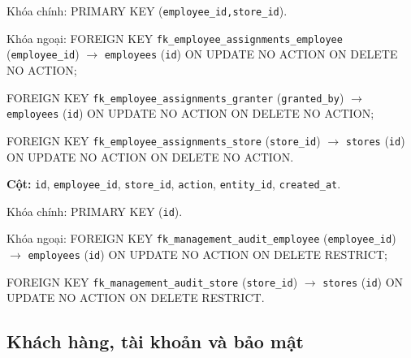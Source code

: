\begin{description}[leftmargin=3.6cm,labelwidth=3.4cm,style=nextline]
Khóa chính: PRIMARY KEY (\texttt{employee\_id,store\_id}).

Khóa ngoại: FOREIGN KEY \texttt{fk\_employee\_assignments\_employee} (\texttt{employee\_id}) $\rightarrow$ \texttt{employees} (\texttt{id}) ON UPDATE NO ACTION ON DELETE NO ACTION;\par FOREIGN KEY \texttt{fk\_employee\_assignments\_granter} (\texttt{granted\_by}) $\rightarrow$ \texttt{employees} (\texttt{id}) ON UPDATE NO ACTION ON DELETE NO ACTION;\par FOREIGN KEY \texttt{fk\_employee\_assignments\_store} (\texttt{store\_id}) $\rightarrow$ \texttt{stores} (\texttt{id}) ON UPDATE NO ACTION ON DELETE NO ACTION.

\item[\texttt{management\_audit}] \textbf{Cột:} \texttt{id}, \texttt{employee\_id}, \texttt{store\_id}, \texttt{action}, \texttt{entity\_id}, \texttt{created\_at}.

Khóa chính: PRIMARY KEY (\texttt{id}).

Khóa ngoại: FOREIGN KEY \texttt{fk\_management\_audit\_employee} (\texttt{employee\_id}) $\rightarrow$ \texttt{employees} (\texttt{id}) ON UPDATE NO ACTION ON DELETE RESTRICT;\par FOREIGN KEY \texttt{fk\_management\_audit\_store} (\texttt{store\_id}) $\rightarrow$ \texttt{stores} (\texttt{id}) ON UPDATE NO ACTION ON DELETE RESTRICT.

\end{description}

\subsection{Khách hàng, tài khoản và bảo mật}

